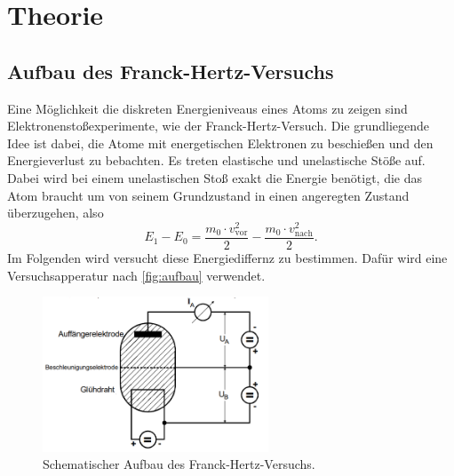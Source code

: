 \section{Theorie}
\label{sec:Theorie}




\subsection{Aufbau des Franck-Hertz-Versuchs}
\label{ssec:aufbau}

Eine Möglichkeit die diskreten Energieniveaus eines Atoms zu zeigen sind Elektronenstoßexperimente, wie der Franck-Hertz-Versuch.
Die grundliegende Idee ist dabei, die Atome mit energetischen Elektronen zu beschießen und den Energieverlust zu bebachten. 
Es treten elastische und unelastische Stöße auf.
Dabei wird bei einem unelastischen Stoß exakt die Energie benötigt, die das Atom braucht um von seinem Grundzustand in einen angeregten Zustand überzugehen, also 
\begin{equation}
    E_1 - E_0 = \frac{m_0 \cdot v^2_\text{vor}}{2} - \frac{m_0 \cdot v^2_\text{nach}}{2}.
    \label{eq:energiedif}
\end{equation}
Im Folgenden wird versucht diese Energiediffernz zu bestimmen.
Dafür wird eine Versuchsapperatur nach \autoref{fig:aufbau} verwendet.

\begin{figure}
    \centering
    \includegraphics[width=0.6\textwidth]{images/bild1.png}
    \caption{Schematischer Aufbau des Franck-Hertz-Versuchs.\cite{V601}}
    \label{fig:aufbau}
\end{figure}

